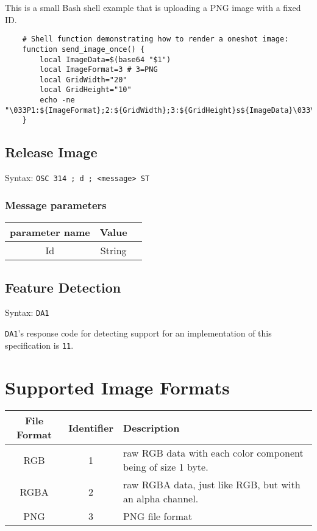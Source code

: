 \documentclass[a4paper]{article}
\newcommand{\code}[1]{\colorbox{light-gray}{\texttt{#1}}}
\newcommand{\DA}{\code{DA1}}
\begin{document}
This is a small Bash shell example that is uploading a PNG image with a fixed ID.

\begin{verbatim}
    # Shell function demonstrating how to render a oneshot image:
    function send_image_once() {
        local ImageData=$(base64 "$1")
        local ImageFormat=3 # 3=PNG
        local GridWidth="20"
        local GridHeight="10"
        echo -ne "\033P1:${ImageFormat};2:${GridWidth};3:${GridHeight}s${ImageData}\033\\"
    }
\end{verbatim}

\subsection{Release Image} %

Syntax: \code{OSC 314 ; d ; <message> ST}

\subsubsection*{Message parameters}

\begin{tabular}{ |c|c|l| }
    \hline
    \textbf{parameter name}   & \textbf{Value} \\
    \hline
    Id          & String \\
    \hline
\end{tabular}

\subsection{Feature Detection} %

Syntax: \DA

\DA's response code for detecting support for an implementation of this specification is \code{11}.

\section{Supported Image Formats} %

\label{sec:supported-image-formtats}

\begin{tabular}{c | c | l}
    File Format & Identifier & Description \\ \hline
    RGB         & 1          & raw RGB data with each color component being of size 1 byte. \\
    RGBA        & 2          & raw RGBA data, just like RGB, but with an alpha channel. \\
    PNG         & 3          & PNG file format \\
\end{tabular}
\end{document}
